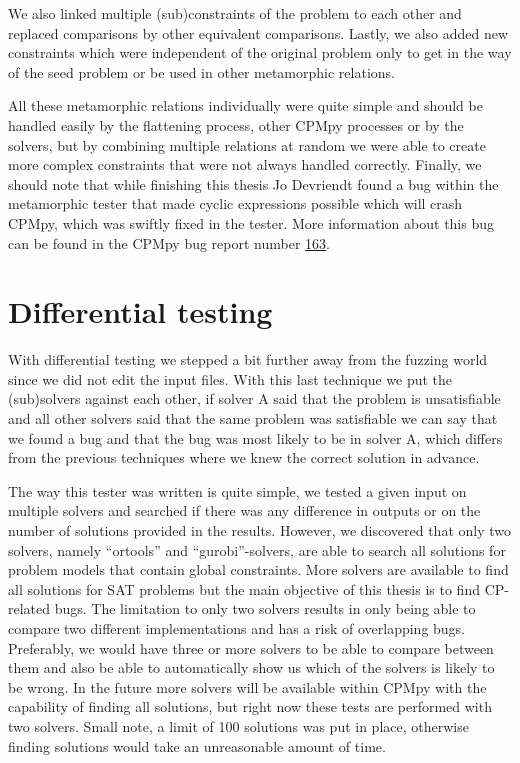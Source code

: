 We also linked multiple (sub)constraints of the problem to each other and replaced comparisons by other equivalent comparisons. Lastly, we also added new constraints which were independent of the original problem only to get in the way of the seed problem or be used in other metamorphic relations.

All these metamorphic relations individually were quite simple and should be handled easily by the flattening process, other CPMpy processes or by the solvers, but by combining multiple relations at random we were able to create more complex constraints that were not always handled correctly. Finally, we should note that while finishing this thesis Jo Devriendt found a bug within the metamorphic tester that made cyclic expressions possible which will crash CPMpy, which was swiftly fixed in the tester. More information about this bug can be found in the CPMpy bug report number \href{https://github.com/CPMpy/cpmpy/issues/163}{163}.

\section{Differential testing}
\label{impl:diff}
With differential testing we stepped a bit further away from the fuzzing world since we did not edit the input files.
With this last technique we put the (sub)solvers against each other, if solver A said that the problem is unsatisfiable and all other solvers said that the same problem was satisfiable we can say that we found a bug and that the bug was most likely to be in solver A, which differs from the previous techniques where we knew the correct solution in advance.


The way this tester was written is quite simple, we tested a given input on multiple solvers and searched if there was any difference in outputs or on the number of solutions provided in the results.
However, we discovered that only two solvers, namely “ortools” and “gurobi”-solvers, are able to search all solutions for problem models that contain global constraints. More solvers are available to find all solutions for SAT problems but 
the main objective of this thesis is to find CP-related bugs. The limitation to only two solvers results in only being able to compare two different implementations and has a risk of overlapping bugs. Preferably, we would have three or more solvers to be able to compare between them and also be able to automatically show us which of the solvers is likely to be wrong. In the future more solvers will be available within CPMpy with the capability of finding all solutions, but right now these tests are performed with two solvers. Small note, a limit of 100 solutions was put in place, otherwise finding solutions would take an unreasonable amount of time. 

